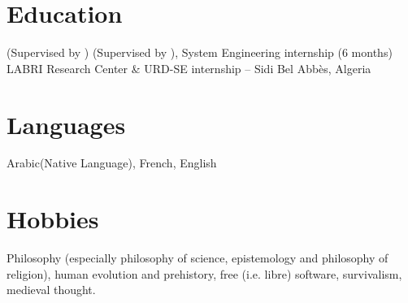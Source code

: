 \documentclass{cv}
\begin{document}
\section{Education}
{\footnotesize{(Supervised by \rhn)}}
{}
{\footnotesize{(Supervised by \rhn)}, System Engineering internship (6 months)}
{\footnotesize{LABRI Research Center  \& URD-SE internship -- Sidi Bel Abbès, Algeria\vspace{.2cm}}}

\section{Languages}
Arabic(Native Language), French, English
\section{Hobbies}

Philosophy (especially philosophy of science, epistemology and philosophy of religion), human evolution and prehistory, free (i.e. libre) software, survivalism, medieval thought.




\end{document}
